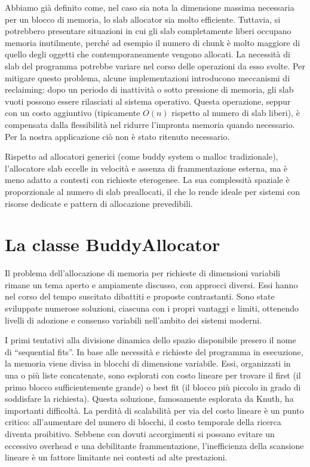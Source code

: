 Abbiamo già definito come, nel caso sia nota la dimensione massima necessaria per un blocco di memoria, lo slab allocator sia molto efficiente. Tuttavia, si potrebbero presentare situazioni in cui gli slab completamente liberi occupano memoria inutilmente, perché ad esempio il numero di chunk è molto maggiore di quello degli oggetti che contemporaneamente vengono allocati. La necessità di slab del programma potrebbe variare nel corso delle operazioni da esso svolte. Per mitigare questo problema, alcune implementazioni introducono meccanismi di reclaiming: dopo un periodo di inattività o sotto pressione di memoria, gli slab vuoti possono essere rilasciati al sistema operativo. Questa operazione, seppur con un costo aggiuntivo (tipicamente $O(n)$ rispetto al numero di slab liberi), è compensata dalla flessibilità nel ridurre l’impronta memoria quando necessario. Per la nostra applicazione ciò non è stato ritenuto necessario.

Rispetto ad allocatori generici (come buddy system o malloc tradizionale), l’allocatore slab eccelle in velocità e assenza di frammentazione esterna, ma è meno adatto a contesti con richieste eterogenee. La sua complessità spaziale è proporzionale al numero di slab preallocati, il che lo rende ideale per sistemi con risorse dedicate e pattern di allocazione prevedibili.

\section{La classe BuddyAllocator}

Il problema dell’allocazione di memoria per richieste di dimensioni variabili rimane un tema aperto e ampiamente discusso, con approcci diversi. Essi hanno nel corso del tempo suscitato dibattiti e proposte contrastanti. Sono state sviluppate numerose soluzioni, ciascuna con i propri vantaggi e limiti, ottenendo livelli di adozione e consenso variabili nell'ambito dei sistemi moderni.

I primi tentativi alla divisione dinamica dello spazio disponibile presero il nome di ``sequential fits''. In base alle necessità e richieste del programma in esecuzione, la memoria viene divisa in blocchi di dimensione variabile. Essi, organizzati in una o più liste concatenate, sono esplorati con costo lineare per trovare il first (il primo blocco sufficientemente grande) o best fit (il blocco più piccolo in grado di soddisfare la richiesta). Questa soluzione, famosamente esplorata da Knuth, ha importanti difficoltà. La perdità di scalabilità per via del costo lineare è un punto critico: all’aumentare del numero di blocchi, il costo temporale della ricerca diventa proibitivo. Sebbene con dovuti accorgimenti si possano evitare un eccessivo overhead e una debilitante frammentazione, l’inefficienza della scansione lineare è un fattore limitante nei contesti ad alte prestazioni.

